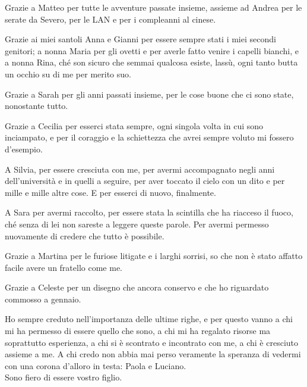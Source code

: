 Grazie a Matteo per tutte le avventure passate insieme, assieme ad Andrea per le serate da Severo, per le LAN e per i compleanni al cinese.

Grazie ai miei santoli Anna e Gianni per essere sempre stati i miei secondi genitori; a nonna Maria per gli ovetti e per averle fatto venire i capelli bianchi, e a nonna Rina, ché son sicuro che semmai qualcosa esiste, lassù, ogni tanto butta un occhio su di me per merito suo.

Grazie a Sarah per gli anni passati insieme, per le cose buone che ci sono state, nonostante tutto.

Grazie a Cecilia per esserci stata sempre, ogni singola volta in cui sono inciampato, e per il coraggio e la schiettezza che avrei sempre voluto mi fossero d'esempio.

A Silvia, per essere cresciuta con me, per avermi accompagnato negli anni dell'università e in quelli a seguire, per aver toccato il cielo con un dito e per mille e mille altre cose. E per esserci di nuovo, finalmente.

A Sara per avermi raccolto, per essere stata la scintilla che ha riacceso il fuoco, ché senza di lei non sareste a leggere queste parole. Per avermi permesso nuovamente di credere che tutto è possibile.

Grazie a Martina per le furiose litigate e i larghi sorrisi, so che non è stato affatto facile avere un fratello come me.

Grazie a Celeste per un disegno che ancora conservo e che ho riguardato commosso a gennaio.

Ho sempre creduto nell'importanza delle ultime righe, e per questo vanno a chi mi ha permesso di essere quello che sono, a chi mi ha regalato risorse ma soprattutto esperienza, a chi si è scontrato e incontrato con me, a chi è cresciuto assieme a me. A chi credo non abbia mai perso veramente la speranza di vedermi con una corona d'alloro in testa: Paola e Luciano.\\
Sono fiero di essere vostro figlio.
